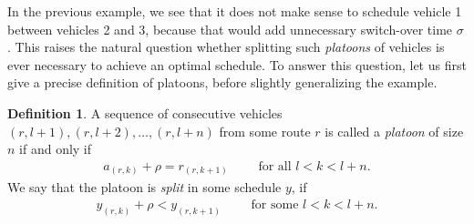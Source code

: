\documentclass[a4paper]{report}
\theoremstyle{definition}
\newtheorem{define}{Definition}[chapter]
\theoremstyle{plain}
\begin{document}
In the previous example, we see that it does not make sense to schedule vehicle
1 between vehicles 2 and 3, because that would add unnecessary switch-over time
$\sigma$. This raises the natural question whether splitting such
\textit{platoons} of vehicles is ever necessary to achieve an optimal schedule.
To answer this question, let us first give a precise definition of platoons,
before slightly generalizing the example.
%
\begin{define}
  A sequence of consecutive vehicles $(r, l+1), (r, l+2), \dots, (r, l+n)$ from
  some route $r$ is called a \textit{platoon} of size $n$ if and only if
  \begin{align}
  a_{(r,k)} + \rho = r_{(r, k+1)}  \quad \quad \text{ for all } l < k < l + n.
  \end{align}
 We say that the platoon is \textit{split}
  in some schedule $y$, if
  \begin{align}
  y_{(r, k)} + \rho < y_{(r, k + 1)} \quad \quad \text{ for some } l < k < l + n.
  \end{align}
\end{define}
%
\end{document}
